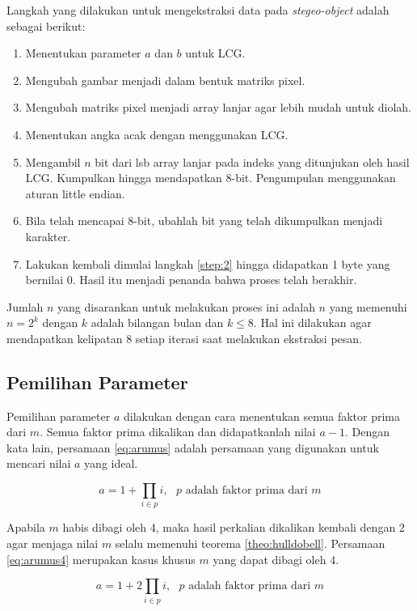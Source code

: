 \documentclass[10pt,conference]{IEEEtran}
\theoremstyle{definition}
\begin{document}
Langkah yang dilakukan untuk mengekstraksi data pada \emph{stegeo-object} adalah sebagai berikut:
\begin{enumerate}
    \item Menentukan parameter $a$ dan $b$ untuk LCG.
    \item Mengubah gambar menjadi dalam bentuk matriks pixel.
    \item Mengubah matriks pixel menjadi array lanjar agar lebih mudah untuk diolah.
    \item \label{step:2} Menentukan angka acak dengan menggunakan LCG.
    \item Mengambil $n$ bit dari lsb array lanjar pada indeks yang ditunjukan oleh hasil LCG. Kumpulkan hingga mendapatkan 8-bit. Pengumpulan menggunakan aturan little endian.
    \item Bila telah mencapai 8-bit, ubahlah bit yang telah dikumpulkan menjadi karakter.
    \item Lakukan kembali dimulai langkah \ref{step:2} hingga didapatkan 1 byte yang bernilai 0. Hasil itu menjadi penanda bahwa proses telah berakhir.
\end{enumerate}

Jumlah $n$ yang disarankan untuk melakukan proses ini adalah $n$ yang memenuhi $n = 2^k$ dengan $k$ adalah bilangan bulan dan $k \le 8$. Hal ini dilakukan agar mendapatkan kelipatan 8 setiap iterasi saat melakukan
ekstraksi pesan.

\subsection{Pemilihan Parameter}
Pemilihan parameter $a$ dilakukan dengan cara menentukan semua faktor prima dari $m$. Semua faktor prima dikalikan dan didapatkanlah nilai $a-1$. Dengan kata lain, persamaan \ref{eq:arumus} adalah persamaan yang digunakan 
untuk mencari nilai $a$ yang ideal.

\begin{equation} \label{eq:arumus}
    a = 1 + \prod_{i \in p} i, \text{ }p \text{ adalah faktor prima dari }m  
\end{equation} 

Apabila $m$ habis dibagi oleh 4, maka hasil perkalian dikalikan kembali dengan 2 agar menjaga nilai $m$ selalu memenuhi teorema \ref{theo:hulldobell}. Persamaan \ref{eq:arumus4} merupakan kasus khusus $m$ yang dapat dibagi oleh 4.

\begin{equation} \label{eq:arumus4}
    a = 1 + 2 \prod_{i \in p} i, \text{ }p \text{ adalah faktor prima dari }m  
\end{equation} 
\end{document}
